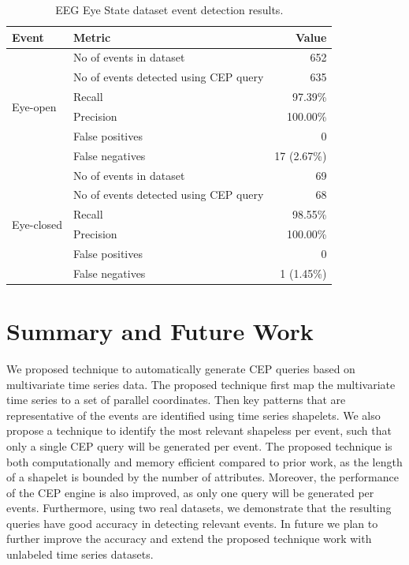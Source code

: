 \documentclass[conference]{IEEEtran}  %
\begin{document}
\begin{table}
\caption{EEG Eye State dataset event detection results.}
\begin{tabular}{ |l|l|l| }
\hline
\textbf{Event} & \textbf{Metric} & \multicolumn{1}{|r|}{\textbf{Value}}\\
\hline
\multirow{6}{*}{Eye-open} & No of events in dataset & \multicolumn{1}{|r|}{652}\\
    & No of events detected using CEP query & \multicolumn{1}{|r|}{635}\\ 
    & Recall & \multicolumn{1}{|r|}{97.39\%}\\
    & Precision & \multicolumn{1}{|r|}{100.00\%}\\
    & False positives & \multicolumn{1}{|r|}{0}\\
    & False negatives & \multicolumn{1}{|r|}{17 (2.67\%)}\\
\hline
\multirow{6}{*}{Eye-closed} & No of events in dataset & \multicolumn{1}{|r|}{69}\\
    & No of events detected using CEP query & \multicolumn{1}{|r|}{68}\\
    & Recall & \multicolumn{1}{|r|}{98.55\%}\\
    & Precision & \multicolumn{1}{|r|}{100.00\%}\\
    & False positives & \multicolumn{1}{|r|}{0}\\
    & False negatives & \multicolumn{1}{|r|}{1 (1.45\%)}\\
\hline
\end{tabular}
\squeezeup\squeezeup
\end{table}

\section{Summary and Future Work}
We proposed technique to automatically generate CEP queries based on multivariate time series data. The proposed technique first map the multivariate time series to a set of parallel coordinates. Then key patterns that are representative of the events are identified using time series shapelets. We also propose a technique to identify the most relevant shapeless per event, such that only a single CEP query will be generated per event. The proposed technique is both computationally and memory efficient compared to prior work, as the length of a shapelet is bounded by the number of attributes. Moreover, the performance of the CEP engine is also improved, as only one query will be generated per events. Furthermore, using two real datasets, we demonstrate that the resulting queries have good accuracy in detecting relevant events. In future we plan to further improve the accuracy and extend the proposed technique work with unlabeled time series datasets.

\nocite{*}


\end{document}
